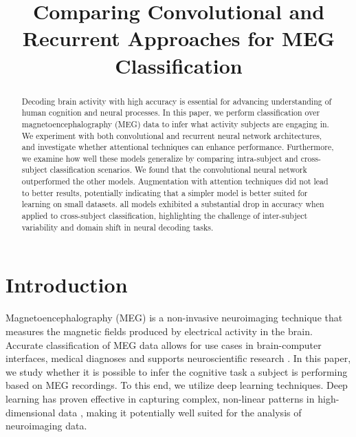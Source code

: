 \documentclass[conference]{IEEEtran}
\begin{document}
\title{Comparing Convolutional and Recurrent Approaches for MEG Classification}

\author{
}

\maketitle

\begin{abstract}
Decoding brain activity with high accuracy is essential for advancing understanding of human cognition and 
neural processes. In this paper, we perform classification over magnetoencephalography (MEG) data to infer what
activity subjects are engaging in.  We experiment with both convolutional and recurrent neural network architectures, and
investigate whether attentional techniques can enhance performance. Furthermore, we examine how well these models generalize by comparing intra-subject and cross-subject classification scenarios. We found that the convolutional neural network outperformed
 the other models. Augmentation with attention techniques did not lead to better results, potentially indicating that a simpler model
 is better suited for learning on small datasets. all models exhibited a substantial drop in accuracy when applied to cross-subject classification, highlighting the challenge of inter-subject variability and domain shift in neural decoding tasks.




\end{abstract}

\section{Introduction}
Magnetoencephalography (MEG) is a non-invasive neuroimaging technique that measures the magnetic fields produced by electrical 
activity in the brain. Accurate classification of MEG data allows for use cases in brain-computer interfaces, medical diagnoses and
supports neuroscientific research \cite{belhadi2025eeg}. In this paper, we study whether it is possible to infer the cognitive task a subject is performing
based  on MEG recordings. To this end, we utilize deep learning techniques. Deep learning has proven effective in capturing complex, non-linear
 patterns in high-dimensional data \cite{lecun2015deep}, making it potentially well suited for the analysis of neuroimaging data. 
\end{document}
